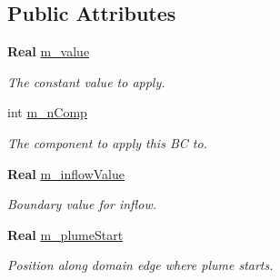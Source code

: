 \subsection*{Public Attributes}
\begin{DoxyCompactItemize}
\item 
\mbox{\label{class_pressure_inflow_value_function_a4ea988fb2567fad484acbdd1192f04c1}} 
\textbf{ Real} \hyperlink{class_pressure_inflow_value_function_a4ea988fb2567fad484acbdd1192f04c1}{m\+\_\+value}
\begin{DoxyCompactList}\small\item\em The constant value to apply. \end{DoxyCompactList}\item 
\mbox{\label{class_pressure_inflow_value_function_a696bcf66ca28efa96314cb959dfb9f6a}} 
int \hyperlink{class_pressure_inflow_value_function_a696bcf66ca28efa96314cb959dfb9f6a}{m\+\_\+n\+Comp}
\begin{DoxyCompactList}\small\item\em The component to apply this BC to. \end{DoxyCompactList}\item 
\mbox{\label{class_pressure_inflow_value_function_acb7b9ec6085a1b79ed4d7bf341185a32}} 
\textbf{ Real} \hyperlink{class_pressure_inflow_value_function_acb7b9ec6085a1b79ed4d7bf341185a32}{m\+\_\+inflow\+Value}
\begin{DoxyCompactList}\small\item\em Boundary value for inflow. \end{DoxyCompactList}\item 
\mbox{\label{class_pressure_inflow_value_function_a14ffe6da33fc18c3394805b8934e9cfc}} 
\textbf{ Real} \hyperlink{class_pressure_inflow_value_function_a14ffe6da33fc18c3394805b8934e9cfc}{m\+\_\+plume\+Start}
\begin{DoxyCompactList}\small\item\em Position along domain edge where plume starts. \end{DoxyCompactList}\item 
\mbox{\label{class_pressure_inflow_value_function_ae342d40736d7519d777db87979f2b713}} 

\end{DoxyCompactItemize}
